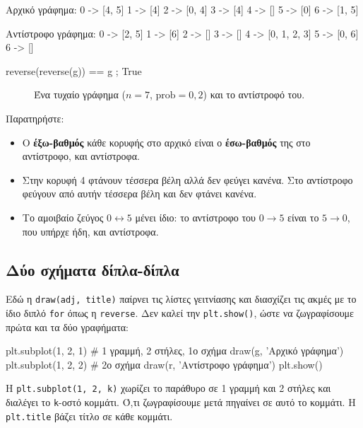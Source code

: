 \documentclass[11pt,a4paper]{article}
\newcommand{\code}[1]{\texttt{#1}}
\renewcommand{\_}{\textunderscore\allowbreak}
\begin{document}
\begin{output}
Αρχικό γράφημα:
   0 -> [4, 5]
   1 -> [4]
   2 -> [0, 4]
   3 -> [4]
   4 -> []
   5 -> [0]
   6 -> [1, 5]

Αντίστροφο γράφημα:
   0 -> [2, 5]
   1 -> [6]
   2 -> []
   3 -> []
   4 -> [0, 1, 2, 3]
   5 -> [0, 6]
   6 -> []

reverse(reverse(g)) == g ; True
\end{output}

\begin{figure}[h]
  \centering
  \hspace{1.2cm}
  \caption{Ένα τυχαίο γράφημα ($n = 7$, $\text{prob} = 0{,}2$) και το αντίστροφό του.}
  \label{fig:reverse}
\end{figure}

Παρατηρήστε:
\begin{itemize}
  \item Ο \textbf{έξω-βαθμός} κάθε κορυφής στο αρχικό είναι ο \textbf{έσω-βαθμός} της στο
        αντίστροφο, και αντίστροφα.
  \item Στην κορυφή 4 φτάνουν τέσσερα βέλη αλλά δεν φεύγει κανένα. Στο αντίστροφο φεύγουν από αυτήν
        τέσσερα βέλη και δεν φτάνει κανένα.
  \item Το αμοιβαίο ζεύγος $0 \leftrightarrow 5$ μένει ίδιο: το αντίστροφο του $0 \to 5$ είναι το
        $5 \to 0$, που υπήρχε ήδη, και αντίστροφα.
\end{itemize}

\subsection{Δύο σχήματα δίπλα-δίπλα}
Εδώ η \code{draw(adj, title)} παίρνει τις λίστες γειτνίασης και διασχίζει τις ακμές με το ίδιο διπλό
\code{for} όπως η \code{reverse}. Δεν καλεί την \code{plt.show()}, ώστε να ζωγραφίσουμε πρώτα και τα
δύο γραφήματα:
\begin{Piton}
plt.subplot(1, 2, 1)       # 1 γραμμή, 2 στήλες, 1ο σχήμα
draw(g, 'Αρχικό γράφημα')
plt.subplot(1, 2, 2)       # 2ο σχήμα
draw(r, 'Αντίστροφο γράφημα')
plt.show()
\end{Piton}
Η \code{plt.subplot(1, 2, k)} χωρίζει το παράθυρο σε 1 γραμμή και 2 στήλες και διαλέγει το
\code{k}-οστό κομμάτι. Ό,τι ζωγραφίσουμε μετά πηγαίνει σε αυτό το κομμάτι. Η \code{plt.title} βάζει
τίτλο σε κάθε κομμάτι.
\end{document}
